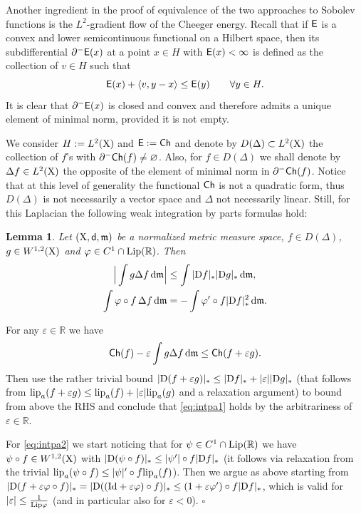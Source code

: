 \documentclass[11pt]{article}
\numberwithin{equation}{section}
\newtheorem{lemma}[theorem]{Lemma}
\newenvironment{idea}{\removelastskip\par\medskip   %
\noindent{\em Idea of the proof} \rm}{\penalty-20\null\hfill$\square$\par\medbreak}
\newcommand{\R}{\mathbb{R}}
\newcommand{\X}{{\rm X}}
\newcommand{\sfd}{{\sf d}}
\newcommand{\mm}{{\mathfrak m}}
\newcommand{\ch}{{\sf Ch}}
\renewcommand{\d}{{\rm d}}
\newcommand{\D}{{\rm D}}
\newcommand{\Lip}{{\rm Lip}}
\newcommand{\lipa}{{\rm lip}_a}
\newcommand{\eps}{\varepsilon}
\newcommand{\Id}{{\rm Id}}
\newcommand{\E}{{\sf E}} %
\newcommand\la{\langle}
\newcommand\ra{\rangle}
\begin{document}
Another ingredient in the proof of equivalence of the two approaches to Sobolev functions is the $L^2$-gradient flow of the Cheeger energy. Recall that if $\sf E$ is a convex and lower semicontinuous functional on a Hilbert space, then its subdifferential $\partial^-\E(x)$ at a point $x\in H$ with $\E(x)<\infty$ is defined as the collection of $v\in H$ such that
\[
\E(x)+\la v,y-x\ra\leq \E(y)\qquad\forall y\in H.
\]
It is clear that $\partial^-\E(x)$ is closed and convex and therefore admits a unique element of minimal norm, provided it is not empty.

We consider $H:=L^2(\X)$ and $\E:=\ch$ and denote by $D(\Delta)\subset L^2(\X)$ the collection of $f$'s with $\partial^-\ch(f)\neq\varnothing$. Also, for $f\in D(\Delta)$ we shall denote by $\Delta f\in L^2(\X)$ the opposite of the element of minimal norm in $\partial^-\ch(f)$. Notice that at this level of generality the functional $\ch$ is not a quadratic form, thus $D(\Delta)$ is not necessarily a vector space and $\Delta$ not necessarily linear. Still, for this  Laplacian the following weak integration by parts formulas hold:
\begin{lemma}\label{le:inpartI}
Let $(\X,\sfd,\mm)$ be a normalized metric measure space, $f\in D(\Delta)$, $g\in W^{1,2}(\X)$ and $\varphi\in C^1\cap \Lip(\R)$. Then 
\begin{subequations}
\begin{align}\label{eq:intpa1}
\Big|\int g\Delta f\,\d\mm\Big|&\leq \int |\D f|_*|\D g|_*\,\d\mm,\\
\label{eq:intpa2}
\int \varphi\circ f\,\Delta f\,\d\mm&=-\int \varphi'\circ f |\D f|_*^2\,\d\mm.
\end{align}
\end{subequations}
\end{lemma}
\begin{idea} 
For any $\eps\in\R$ we have
\[
\ch(f)-\eps \int g\Delta f\,\d\mm\leq \ch(f+\eps g).
\]
Then use the rather trivial bound $|\D(f+\eps g)|_*\leq |\D f|_*+|\eps ||\D g|_*$ (that follows from $\lipa(f+\eps g)\leq \lipa(f)+|\eps|\lipa( g)$ and a relaxation argument)  to bound from above the RHS and conclude that \eqref{eq:intpa1} holds by the arbitrariness of $\eps\in\R$. 

For \eqref{eq:intpa2} we start noticing that for $\psi\in C^1\cap\Lip(\R)$ we have $\psi\circ f\in W^{1,2}(\X)$ with $|\D (\psi\circ f)|_*\leq |\psi'|\circ f|\D f|_*$ (it follows via relaxation from the trivial $\lipa(\psi\circ f)\leq |\psi|'\circ f\lipa (f)$). Then we argue as above starting from $|\D(f+\eps \varphi\circ f)|_*=|\D( (\Id+\eps\varphi)\circ f)|_*\leq (1+\eps\varphi')\circ f|\D f|_*$, which is   valid for $|\eps|\leq \frac1{\Lip\varphi}$ (and in particular also for $\eps<0$).
\end{idea}
\end{document}
